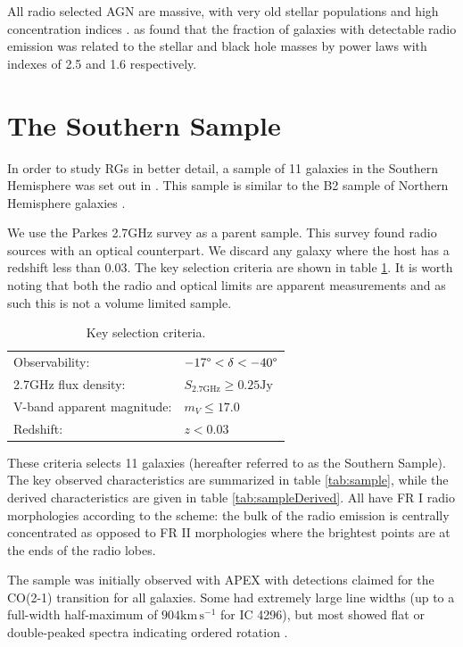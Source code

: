			All radio selected AGN are massive, with very old stellar populations and high concentration indices \citep{Best2005}. \citet{Best2005} as found that the fraction of galaxies with detectable radio emission was related to the stellar and black hole masses by power laws with indexes of 2.5 and 1.6 respectively. 

\section{The Southern Sample}
	\label{sec:Sample}
	In order to study RGs in better detail, a sample of 11 galaxies in the Southern Hemisphere was set out in \citet{Prandoni2010}. This sample is similar to the B2 sample of Northern Hemisphere galaxies \citep{Prandoni2007}. 

	We use the Parkes 2.7GHz survey as a parent sample. This survey found radio sources with an optical counterpart. We discard any galaxy where the host has a redshift less than 0.03. The key selection criteria are shown in table \ref{tab:selection}. It is worth noting that both the radio and optical limits are apparent measurements and as such this is not a volume limited sample.

	\begin{table}
		\centering
		\caption{Key selection criteria.}
		\label{tab:selection}
		\begin{tabular}{l l}
			\hline
			\hline
			Observability:				& $-17\degree < \delta < -40\degree$ \\
			2.7GHz flux density: 		& $S_\text{2.7GHz} \ge 0.25 \text{Jy} $ \\
			V-band apparent magnitude: 	& $m_V \le 17.0 $ \\
			Redshift: 					& $z < 0.03$ \\			
			\hline
			\hline
		\end{tabular}
	\end{table}

	These criteria selects 11 galaxies (hereafter referred to as the Southern Sample). The key observed characteristics are summarized in table \ref{tab:sample}, while the derived characteristics are given in table \ref{tab:sampleDerived}. All have FR I radio morphologies according to the \citet{Fanaroff1974} scheme: the bulk of the radio emission is centrally concentrated as opposed to FR II morphologies where the brightest points are at the ends of the radio lobes. 

	The sample was initially observed with APEX with detections claimed for the CO(2-1) transition for all galaxies. Some had extremely large line widths (up to a full-width half-maximum of $904 \mathrm{km \, s^{-1}}$ for IC 4296), but most showed flat or double-peaked spectra indicating ordered rotation \citep{Prandoni2012}.

